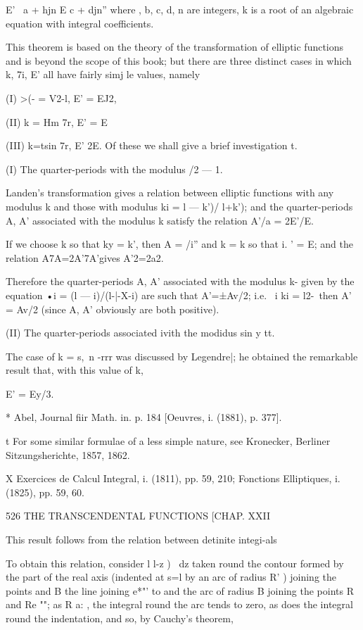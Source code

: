 E' \ a + hjn E c + djn'' where , b, c, d, n are integers, k is a root
of an algebraic equation with integral coefficients.

This theorem is based on the theory of the transformation of elliptic
functions and is beyond the scope of this book; but there are three
distinct cases in which k, 7i, E' all have fairly simj le values,
namely

(I) >(- = V2-l, E' = EJ2,

(II) k = Hm 7r, E' = E %

(III) k=tsin 7r, E' 2E. Of these we shall give a brief investigation
t.

(I) The quarter-periods with the modulus /2 — 1.

Landen's transformation gives a relation between elliptic functions
with any modulus k and those with modulus ki = l — k')/ l+k'); and the
quarter-periods A, A' associated with the modulus k satisfy the
relation A'/a = 2E'/E.

If we choose k so that ky = k', then A = /i'' and k = k so that i. ' =
E; and the relation A7A=2A'7A'gives A'2=2a2.

Therefore the quarter-periods A, A' associated with the modulus k-
given by the equation •i = (l — i)/(l-|-X-i) are such that A'=±Av/2;
i.e. \ i ki = l2-\, then A' = Av/2 (since A, A' obviously are both
positive).

(II) The quarter-periods associated ivith the modidus sin y tt.

The case of k = s,\ n -rrr was discussed by Legendre|; he obtained the
remarkable result that, with this value of k,

E' = Ey/3.

* Abel, Journal fiir Math. in. p. 184 [Oeuvres, i. (1881), p. 377].

t For some similar formulae of a less simple nature, see Kronecker,
Berliner Sitzungsherichte, 1857, 1862.

X Exercices de Calcul Integral, i. (1811), pp. 59, 210; Fonctions
Elliptiques, i. (1825), pp. 59, 60.

526 THE TRANSCENDENTAL FUNCTIONS [CHAP. XXII

This result follows from the relation between detinite integi-als

To obtain this relation, consider l l-z )~ dz taken round the contour
formed by the part of the real axis (indented at s=l by an arc of
radius R' ) joining the points and B the line joining e*"' to and the
arc of radius B joining the points R and Re ""; as R a: , the
integral round the arc tends to zero, as does the integral round the
indentation, and so, by Cauchy's theorem,


